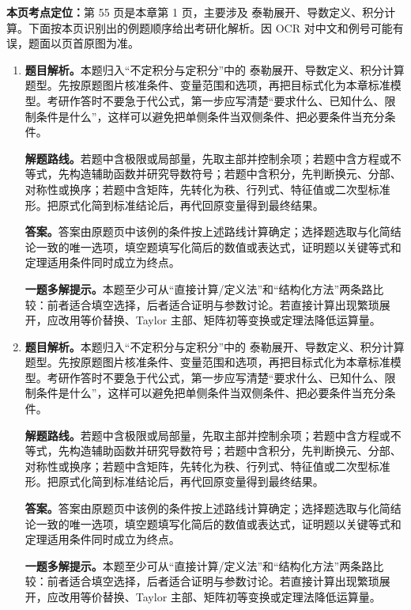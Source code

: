 \begin{solutionblock}
\textbf{本页考点定位：}第 55 页是本章第 1 页，主要涉及 泰勒展开、导数定义、积分计算。下面按本页识别出的例题顺序给出考研化解析。因 OCR 对中文和例号可能有误，题面以页首原图为准。

\begin{enumerate}[label=\textbf{例\arabic*.}, leftmargin=2.4em]

\item \textbf{题目解析。}本题归入“不定积分与定积分”中的 泰勒展开、导数定义、积分计算 题型。先按原题图片核准条件、变量范围和选项，再把目标式化为本章标准模型。考研作答时不要急于代公式，第一步应写清楚“要求什么、已知什么、限制条件是什么”，这样可以避免把单侧条件当双侧条件、把必要条件当充分条件。

\textbf{解题路线。}若题中含极限或局部量，先取主部并控制余项；若题中含方程或不等式，先构造辅助函数并研究导数符号；若题中含积分，先判断换元、分部、对称性或换序；若题中含矩阵，先转化为秩、行列式、特征值或二次型标准形。把原式化简到标准结论后，再代回原变量得到最终结果。

\textbf{答案。}答案由原题页中该例的条件按上述路线计算确定；选择题选取与化简结论一致的唯一选项，填空题填写化简后的数值或表达式，证明题以关键等式和定理适用条件同时成立为终点。

\textbf{一题多解提示。}本题至少可从“直接计算/定义法”和“结构化方法”两条路比较：前者适合填空选择，后者适合证明与参数讨论。若直接计算出现繁琐展开，应改用等价替换、Taylor 主部、矩阵初等变换或定理法降低运算量。

\item \textbf{题目解析。}本题归入“不定积分与定积分”中的 泰勒展开、导数定义、积分计算 题型。先按原题图片核准条件、变量范围和选项，再把目标式化为本章标准模型。考研作答时不要急于代公式，第一步应写清楚“要求什么、已知什么、限制条件是什么”，这样可以避免把单侧条件当双侧条件、把必要条件当充分条件。

\textbf{解题路线。}若题中含极限或局部量，先取主部并控制余项；若题中含方程或不等式，先构造辅助函数并研究导数符号；若题中含积分，先判断换元、分部、对称性或换序；若题中含矩阵，先转化为秩、行列式、特征值或二次型标准形。把原式化简到标准结论后，再代回原变量得到最终结果。

\textbf{答案。}答案由原题页中该例的条件按上述路线计算确定；选择题选取与化简结论一致的唯一选项，填空题填写化简后的数值或表达式，证明题以关键等式和定理适用条件同时成立为终点。

\textbf{一题多解提示。}本题至少可从“直接计算/定义法”和“结构化方法”两条路比较：前者适合填空选择，后者适合证明与参数讨论。若直接计算出现繁琐展开，应改用等价替换、Taylor 主部、矩阵初等变换或定理法降低运算量。

\end{enumerate}
\end{solutionblock}



